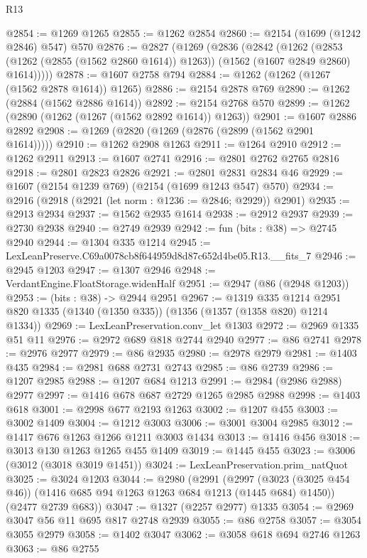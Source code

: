 \begin{lexlean}{R13}
\begin{coremodule}
@2854 := @1269 @1265
@2855 := @1262 @2854
@2860 := @2154 (@1699 (@1242 @2846) @547) @570
@2876 := @2827
    (@1269
      (@2836
        (@2842
          (@1262
            (@2853 (@1262 (@2855 (@1562 @2860 @1614)) @1263))
            (@1562 (@1607 @2849 @2860) @1614)))))
@2878 := @1607 @2758 @794
@2884 := @1262 (@1262 (@1267 (@1562 @2878 @1614)) @1265)
@2886 := @2154 @2878 @769
@2890 := @1262 (@2884 (@1562 @2886 @1614))
@2892 := @2154 @2768 @570
@2899 := @1262 (@2890 (@1262 (@1267 (@1562 @2892 @1614)) @1263))
@2901 := @1607 @2886 @2892
@2908 := @1269 (@2820 (@1269 (@2876 (@2899 (@1562 @2901 @1614)))))
@2910 := @1262 @2908 @1263
@2911 := @1264 @2910
@2912 := @1262 @2911
@2913 := @1607 @2741
@2916 := @2801 @2762 @2765 @2816
@2918 := @2801 @2823 @2826
@2921 := @2801 @2831 @2834 @46
@2929 := @1607 (@2154 @1239 @769) (@2154 (@1699 @1243 @547) @570)
@2934 := @2916 (@2918 (@2921 (let norm : @1236 := @2846; @2929)) @2901)
@2935 := @2913 @2934
@2937 := @1562 @2935 @1614
@2938 := @2912 @2937
@2939 := @2730 @2938
@2940 := @2749 @2939
@2942 := fun (bits : @38) => @2745 @2940
@2944 := @1304 @335 @1214
@2945 := LexLeanPreserve.C69a0078cb8f644959d8d87c652d4be05.R13.__fits_7
@2946 := @2945 @1203
@2947 := @1307 @2946
@2948 := VerdantEngine.FloatStorage.widenHalf
@2951 := @2947 (@86 (@2948 @1203))
@2953 := (bits : @38) -> @2944 @2951
@2967 := @1319
    @335
    @1214
    @2951
    @820
    @1335
    (@1340 (@1350 @335))
    (@1356 (@1357 (@1358 @820) @1214 @1334))
@2969 := LexLeanPreservation.conv_let @1303
@2972 := @2969 @1335 @51 @11
@2976 := @2972 @689 @818 @2744 @2940
@2977 := @86 @2741
@2978 := @2976 @2977
@2979 := @86 @2935
@2980 := @2978 @2979
@2981 := @1403 @435
@2984 := @2981 @688 @2731 @2743
@2985 := @86 @2739
@2986 := @1207 @2985
@2988 := @1207 @684 @1213
@2991 := @2984 (@2986 @2988) @2977
@2997 := @1416 @678 @687 @2729 @1265 @2985 @2988
@2998 := @1403 @618
@3001 := @2998 @677 @2193 @1263
@3002 := @1207 @455
@3003 := @3002 @1409
@3004 := @1212 @3003
@3006 := @3001 @3004 @2985
@3012 := @1417 @676 @1263 @1266 @1211 @3003 @1434
@3013 := @1416 @456
@3018 := @3013 @130 @1263 @1265 @455 @1409
@3019 := @1445 @455
@3023 := @3006 (@3012 (@3018 @3019 @1451))
@3024 := LexLeanPreservation.prim_natQuot
@3025 := @3024 @1203
@3044 := @2980
    (@2991
      (@2997 (@3023 (@3025 @454 @46)) (@1416 @685 @94 @1263 @1263 @684 @1213 (@1445 @684) @1450))
      (@2477 @2739 @683))
@3047 := @1327 (@2257 @2977) @1335
@3054 := @2969 @3047 @56 @11 @695 @817 @2748 @2939
@3055 := @86 @2758
@3057 := @3054 @3055 @2979
@3058 := @1402 @3047
@3062 := @3058 @618 @694 @2746 @1263
@3063 := @86 @2755

\end{coremodule}
\end{lexlean}
